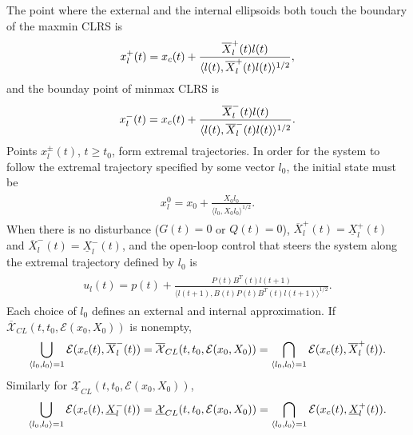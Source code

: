 \documentclass[letterpaper,10pt,english]{sphinxmanual}
\begin{document}
The point where the external and the internal ellipsoids both touch the
boundary of the maxmin CLRS is
\begin{gather}
\begin{split}x_l^+(t) = x_c(t) + \frac{\overline{X}^+_l(t)l(t)}{\langle l(t),
\overline{X}^+_l(t)l(t)\rangle^{1/2}} ,\end{split}\notag
\end{gather}
and the bounday point of minmax CLRS is
\begin{gather}
\begin{split}x_l^-(t) = x_c(t) + \frac{\overline{X}^-_l(t)l(t)}{\langle l(t),
\overline{X}^-_l(t)l(t)\rangle^{1/2}} .\end{split}\notag
\end{gather}
Points $x^{\pm}_l(t)$, $t\geqslant t_0$, form extremal
trajectories. In order for the system to follow the extremal trajectory
specified by some vector $l_0$, the initial state must be
\label{main_source:equation-dx01}\begin{gather}
\begin{split}x_l^0 = x_0 + \frac{X_0l_0}{\langle l_0, X_0l_0\rangle^{1/2}}.\end{split}\label{main_source-dx01}
\end{gather}
When there is no disturbance ($G(t)=0$ or $Q(t)=0$),
$\overline{X}^+_l(t)=\underline{X}^+_l(t)$ and
$\overline{X}^-_l(t)=\underline{X}^-_l(t)$, and the open-loop
control that steers the system along the extremal trajectory defined by
$l_0$ is
\label{main_source:equation-udt}\begin{gather}
\begin{split}u_l(t) = p(t) + \frac{P(t)B^T(t)l(t+1)}{\langle l(t+1),
B(t)P(t)B^T(t)l(t+1)\rangle^{1/2}}.\end{split}\label{main_source-udt}
\end{gather}
Each choice of $l_0$ defines an external and internal
approximation. If $\overline{{\mathcal X}}_{CL}(t,t_0,{\mathcal E}(x_0,X_0))$ is
nonempty,
\begin{gather}
\begin{split}\bigcup_{\langle l_0,l_0\rangle=1}{\mathcal E}(x_c(t),\overline{X}^-_l(t)) =
\overline{{\mathcal X}}_{CL}(t,t_0,{\mathcal E}(x_0,X_0)) =
\bigcap_{\langle l_0,l_0\rangle=1}{\mathcal E}(x_c(t),\overline{X}^+_l(t)).\end{split}\notag
\end{gather}
Similarly for
$\underline{{\mathcal X}}_{CL}(t,t_0,{\mathcal E}(x_0,X_0))$,
\begin{gather}
\begin{split}\bigcup_{\langle l_0,l_0\rangle=1}{\mathcal E}(x_c(t),\underline{X}^-_l(t)) =
\underline{{\mathcal X}}_{CL}(t,t_0,{\mathcal E}(x_0,X_0)) =
\bigcap_{\langle l_0,l_0\rangle=1}{\mathcal E}(x_c(t),\underline{X}^+_l(t)).\end{split}\notag
\end{gather}
\end{document}
